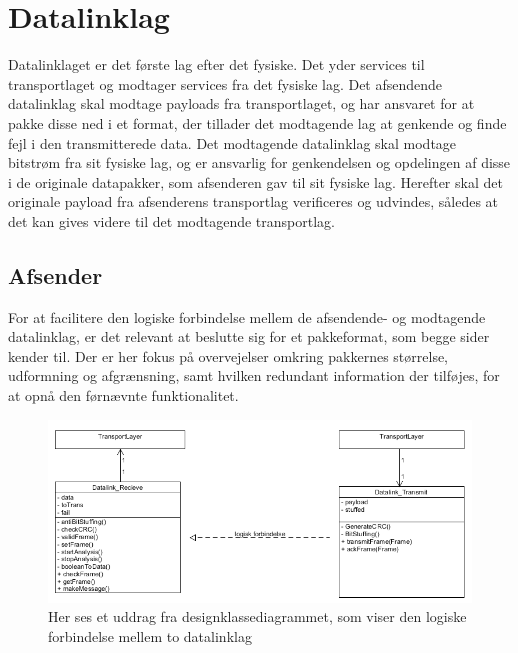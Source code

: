 \section{Datalinklag}
Datalinklaget er det første lag efter det fysiske. Det yder services til transportlaget og modtager services fra det fysiske lag.
    Det afsendende datalinklag skal modtage payloads fra transportlaget, og har ansvaret for at pakke disse ned i et format, der tillader det modtagende lag at genkende og finde fejl i den transmitterede data.
    Det modtagende datalinklag skal modtage bitstrøm fra sit fysiske lag, og er ansvarlig for genkendelsen og opdelingen af disse i de originale datapakker, som afsenderen gav til sit fysiske lag. Herefter skal det originale payload fra afsenderens transportlag verificeres og udvindes, således at det kan gives videre til det modtagende transportlag.

\subsection{Afsender}
For at facilitere den logiske forbindelse mellem de afsendende- og modtagende datalinklag, er det relevant at beslutte sig for et pakkeformat, som begge sider kender til. Der er her fokus på overvejelser omkring pakkernes størrelse, udformning og afgrænsning, samt hvilken redundant information der tilføjes, for at opnå den førnævnte funktionalitet.

\begin{figure}[h!]
\centering
\includegraphics[scale=0.7]{Billeder/DataLinkLogical.PNG}
\caption{Her ses et uddrag fra designklassediagrammet, som viser den logiske forbindelse mellem to datalinklag}
\label{fig:DataLinkLogical}
\end{figure}


